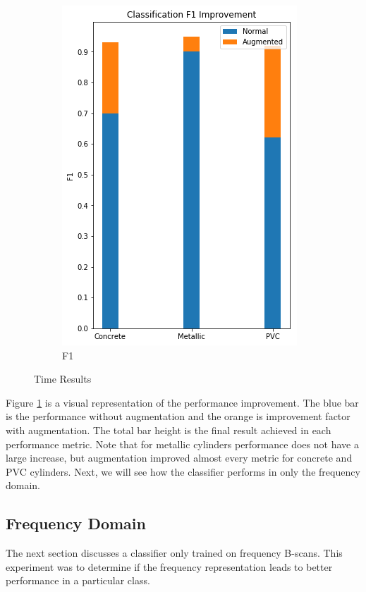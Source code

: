 \begin{figure}[H]
\begin{subfigure}[b]{0.4\linewidth}
    \includegraphics[width=\linewidth]{figures/Time-F1.png}
    \caption{F1}
  \end{subfigure}
  \caption{Time Results}
  \label{fig:time-results}
\end{figure}

Figure \ref{fig:time-results} is a visual representation of the performance improvement. The blue bar is the performance without augmentation and the orange is improvement factor with augmentation. The total bar height is the final result achieved in each performance metric. Note that for metallic cylinders performance does not have a large increase, but augmentation improved almost every metric for concrete and PVC cylinders. Next, we will see how the classifier performs in only the frequency domain.


\subsection{Frequency Domain}
The next section discusses a classifier only trained on frequency B-scans. This experiment was to determine if the frequency representation leads to better performance in a particular class.

